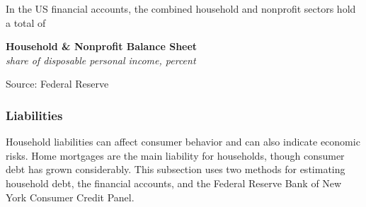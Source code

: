 \documentclass{report}
\makeatletter
\newcommand{\tbllink}[1]{\href{https://raw.githubusercontent.com/bdecon/US-chartbook/master/chartbook/data/#1}{\faTable}}
\newcommand*\short[1]{\expandafter\@gobbletwo\number\numexpr#1\relax}
\newcommand{\absnode}[3]{\node[below right, align=left] at (axis cs: #1,#2) {#3};}
\newcommand{\shdateaxisticks}{
		date coordinates in=x, axis line style={draw=none},
		xmax={2023-11-01},
		max space between ticks=40,	    
		xtick={{1990-01-01}, {1995-01-01}, {2000-01-01}, 
			{2005-01-01}, {2010-01-01}, {2015-01-01}, {2020-01-01}},
		minor xtick={},
		enlarge y limits={0.06}, enlarge x limits={0.01},
		}
\newcommand{\bbar}[2]{extra #1 ticks = {{#2}}, extra #1 tick labels = ,
		extra #1 tick style = {grid=major, grid style={thick, black!25}},}
\newcommand{\stdline}[4]{\addplot[very thick, no markers, color=#1] 
		table [x=#2, y=#3, col sep=comma] {#4};	}
\newcommand{\thickline}[4]{\addplot[ultra thick, no markers, color=#1] 
		table [x=#2, y=#3, col sep=comma] {#4};	}
\newcommand{\rbars}{
		\fill[color=black!10] (axis cs:{1990-07-01},\pgfkeysvalueof{/pgfplots/ymin}) rectangle 
			(axis cs:{1991-03-01}, \pgfkeysvalueof{/pgfplots/ymax});
		\fill[color=black!10] (axis cs:{2007-12-01},\pgfkeysvalueof{/pgfplots/ymin}) rectangle 
			(axis cs:{2009-07-01}, \pgfkeysvalueof{/pgfplots/ymax});
		\fill[color=black!10] (axis cs:{2001-03-01},\pgfkeysvalueof{/pgfplots/ymin}) rectangle 
			(axis cs:{2001-11-01}, \pgfkeysvalueof{/pgfplots/ymax});
		\fill[color=black!10] (axis cs:{2020-02-01},\pgfkeysvalueof{/pgfplots/ymin}) rectangle 
			(axis cs:{2020-05-01}, \pgfkeysvalueof{/pgfplots/ymax});}
\makeatother
\begin{document}
{\begin{minipage}{0.76\textwidth}
In the US financial accounts, the combined household and nonprofit sectors hold a total of 
\end{minipage}

\begin{minipage}{0.31\textwidth}
\small 
\end{minipage} \hspace{5mm}
\begin{minipage}{0.41\textwidth}
\normalsize \textbf{Household \& Nonprofit Balance Sheet}\\
\footnotesize{\textit{share of disposable personal income, percent}}
\vspace{3.6cm}

\hspace{5mm} 

\footnotesize{Source: Federal Reserve} \hfill \tbllink{for.csv}  \ \ 
\end{minipage}
\vspace{0.5mm}

\begin{minipage}{0.76\textwidth}
\subsubsection*{Liabilities}

\small Household liabilities can affect consumer behavior and can also indicate economic risks. Home mortgages are the main liability for households, though consumer debt has grown considerably. This subsection uses two methods for estimating household debt, the financial accounts, and the Federal Reserve Bank of New York Consumer Credit Panel. 


\end{minipage}}
\end{document}
